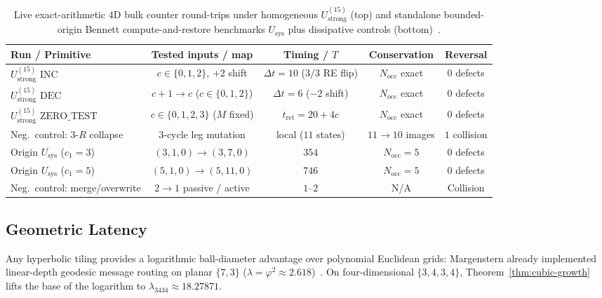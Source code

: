 \begin{table}[tb]
\centering
\caption{Live exact-arithmetic $4\mathrm{D}$ bulk counter round-trips under homogeneous $U_{\mathrm{strong}}^{(15)}$ (top) and standalone bounded-origin Bennett compute-and-restore benchmarks $U_{\mathrm{sys}}$ plus dissipative controls (bottom)~\cite{pollard2026repo}.}
\label{tab:counter-runs}
\footnotesize
\setlength{\tabcolsep}{3.2pt}
\begin{tabular}{@{}lcccc@{}}
\toprule
Run / Primitive & Tested inputs / map & Timing / $T$ & Conservation & Reversal \\
\midrule
$U_{\mathrm{strong}}^{(15)}$ $\mathrm{INC}$ & $c \in \{0,1,2\}$, $+2$ shift & $\Delta t = 10$ ($3/3$ RE flip) & $N_{\mathrm{occ}}$ exact & $0$ defects \\
$U_{\mathrm{strong}}^{(15)}$ $\mathrm{DEC}$ & $c{+}1 \!\to\! c$ ($c \in \{0,1,2\}$) & $\Delta t = 6$ ($-2$ shift) & $N_{\mathrm{occ}}$ exact & $0$ defects \\
$U_{\mathrm{strong}}^{(15)}$ $\mathrm{ZERO\_TEST}$ & $c \in \{0,1,2,3\}$ ($M$ fixed) & $t_{\mathrm{ret}} = 20 + 4c$ & $N_{\mathrm{occ}}$ exact & $0$ defects \\
Neg.\ control: $3$-$R$ collapse & $3$-cycle leg mutation & local ($11$ states) & $11 \to 10$ images & $1$ collision \\
\midrule
Origin $U_{\mathrm{sys}}$ ($c_1=3$) & $(3,1,0) \to (3,7,0)$ & $354$ & $N_{\mathrm{occ}} = 5$ & $0$ defects \\
Origin $U_{\mathrm{sys}}$ ($c_1=5$) & $(5,1,0) \to (5,11,0)$ & $746$ & $N_{\mathrm{occ}} = 5$ & $0$ defects \\
Neg.\ control: merge/overwrite & $2 \to 1$ passive / active & $1$--$2$ & N/A & Collision \\
\bottomrule
\end{tabular}
\end{table}

\subsection{Geometric Latency}
\label{subsec:geometric-latency}

Any hyperbolic tiling provides a logarithmic ball-diameter advantage over polynomial Euclidean grids: Margenstern already implemented linear-depth geodesic message routing on planar $\{7,3\}$ ($\lambda = \varphi^2 \approx 2.618$)~\cite{margenstern2006comm}. On four-dimensional $\{3,4,3,4\}$, Theorem~\ref{thm:cubic-growth} lifts the base of the logarithm to $\lambda_{3434} \approx 18.27871$.

